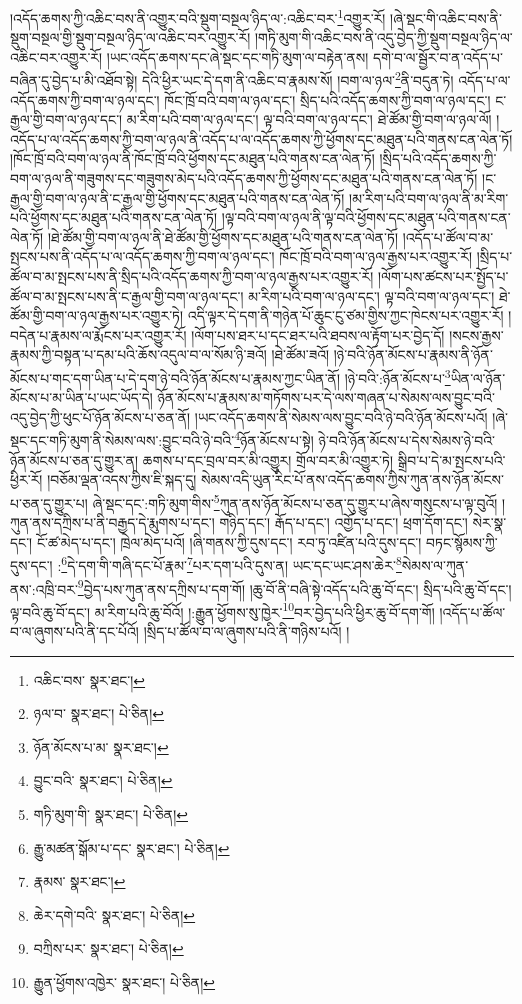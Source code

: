 །འདོད་ཆགས་ཀྱི་འཆིང་བས་ནི་འགྱུར་བའི་སྡུག་བསྔལ་ཉིད་ལ་:འཆིང་བར་\footnote{འཆིང་བས་  སྣར་ཐང་། }འགྱུར་རོ། །ཞེ་སྡང་གི་འཆིང་བས་ནི་སྡུག་བསྔལ་གྱི་སྡུག་བསྔལ་ཉིད་ལ་འཆིང་བར་འགྱུར་རོ། །གཏི་མུག་གི་འཆིང་བས་ནི་འདུ་བྱེད་ཀྱི་སྡུག་བསྔལ་ཉིད་ལ་འཆིང་བར་འགྱུར་རོ། །ཡང་འདོད་ཆགས་དང་ཞེ་སྡང་དང་གཏི་མུག་ལ་བརྟེན་ནས། དགེ་བ་ལ་སྦྱོར་བ་ན་འདོད་པ་བཞིན་དུ་བྱེད་པ་མི་འཐོབ་སྟེ། དེའི་ཕྱིར་ཡང་དེ་དག་ནི་འཆིང་བ་རྣམས་སོ། །བག་ལ་ཉལ་\footnote{ཉལ་བ་  སྣར་ཐང་།  པེ་ཅིན། }ནི་བདུན་ཏེ། འདོད་པ་ལ་འདོད་ཆགས་ཀྱི་བག་ལ་ཉལ་དང་། ཁོང་ཁྲོ་བའི་བག་ལ་ཉལ་དང་། སྲིད་པའི་འདོད་ཆགས་ཀྱི་བག་ལ་ཉལ་དང་། ང་རྒྱལ་གྱི་བག་ལ་ཉལ་དང་། མ་རིག་པའི་བག་ལ་ཉལ་དང་། ལྟ་བའི་བག་ལ་ཉལ་དང་། ཐེ་ཚོམ་གྱི་བག་ལ་ཉལ་ལོ། །འདོད་པ་ལ་འདོད་ཆགས་ཀྱི་བག་ལ་ཉལ་ནི་འདོད་པ་ལ་འདོད་ཆགས་ཀྱི་ཕྱོགས་དང་མཐུན་པའི་གནས་ངན་ལེན་ཏོ། །ཁོང་ཁྲོ་བའི་བག་ལ་ཉལ་ནི་ཁོང་ཁྲོ་བའི་ཕྱོགས་དང་མཐུན་པའི་གནས་ངན་ལེན་ཏོ། །སྲིད་པའི་འདོད་ཆགས་ཀྱི་བག་ལ་ཉལ་ནི་གཟུགས་དང་གཟུགས་མེད་པའི་འདོད་ཆགས་ཀྱི་ཕྱོགས་དང་མཐུན་པའི་གནས་ངན་ལེན་ཏོ། །ང་རྒྱལ་གྱི་བག་ལ་ཉལ་ནི་ང་རྒྱལ་གྱི་ཕྱོགས་དང་མཐུན་པའི་གནས་ངན་ལེན་ཏོ། །མ་རིག་པའི་བག་ལ་ཉལ་ནི་མ་རིག་པའི་ཕྱོགས་དང་མཐུན་པའི་གནས་ངན་ལེན་ཏོ། །ལྟ་བའི་བག་ལ་ཉལ་ནི་ལྟ་བའི་ཕྱོགས་དང་མཐུན་པའི་གནས་ངན་ལེན་ཏོ། །ཐེ་ཚོམ་གྱི་བག་ལ་ཉལ་ནི་ཐེ་ཚོམ་གྱི་ཕྱོགས་དང་མཐུན་པའི་གནས་ངན་ལེན་ཏོ། །འདོད་པ་ཚོལ་བ་མ་སྤངས་པས་ནི་འདོད་པ་ལ་འདོད་ཆགས་ཀྱི་བག་ལ་ཉལ་དང་། ཁོང་ཁྲོ་བའི་བག་ལ་ཉལ་རྒྱས་པར་འགྱུར་རོ། །སྲིད་པ་ཚོལ་བ་མ་སྤངས་པས་ནི་སྲིད་པའི་འདོད་ཆགས་ཀྱི་བག་ལ་ཉལ་རྒྱས་པར་འགྱུར་རོ། །ལོག་པས་ཚངས་པར་སྤྱོད་པ་ཚོལ་བ་མ་སྤངས་པས་ནི་ང་རྒྱལ་གྱི་བག་ལ་ཉལ་དང་། མ་རིག་པའི་བག་ལ་ཉལ་དང་། ལྟ་བའི་བག་ལ་ཉལ་དང་། ཐེ་ཚོམ་གྱི་བག་ལ་ཉལ་རྒྱས་པར་འགྱུར་ཏེ། འདི་ལྟར་དེ་དག་ནི་གཉེན་པོ་ཆུང་ངུ་ཙམ་གྱིས་ཀྱང་ཁེངས་པར་འགྱུར་རོ། །བདེན་པ་རྣམས་ལ་རྨོངས་པར་འགྱུར་རོ། །ལོག་པས་ཐར་པ་དང་ཐར་པའི་ཐབས་ལ་རྟོག་པར་བྱེད་དོ། །སངས་རྒྱས་རྣམས་ཀྱི་བསྟན་པ་དམ་པའི་ཆོས་འདུལ་བ་ལ་སོམ་ཉི་ཟའོ། །ཐེ་ཚོམ་ཟའོ། །ཉེ་བའི་ཉོན་མོངས་པ་རྣམས་ནི་ཉོན་མོངས་པ་གང་དག་ཡིན་པ་དེ་དག་ཉེ་བའི་ཉོན་མོངས་པ་རྣམས་ཀྱང་ཡིན་ནོ། །ཉེ་བའི་:ཉོན་མོངས་པ་\footnote{ཉོན་མོངས་པ་མ་  སྣར་ཐང་། }ཡིན་ལ་ཉོན་མོངས་པ་མ་ཡིན་པ་ཡང་ཡོད་དེ། ཉོན་མོངས་པ་རྣམས་མ་གཏོགས་པར་དེ་ལས་གཞན་པ་སེམས་ལས་བྱུང་བའི་འདུ་བྱེད་ཀྱི་ཕུང་པོ་ཉོན་མོངས་པ་ཅན་ནོ། །ཡང་འདོད་ཆགས་ནི་སེམས་ལས་བྱུང་བའི་ཉེ་བའི་ཉོན་མོངས་པའོ། །ཞེ་སྡང་དང་གཏི་མུག་ནི་སེམས་ལས་:བྱུང་བའི་ཉེ་བའི་\footnote{བྱུང་བའི་  སྣར་ཐང་།  པེ་ཅིན། }ཉོན་མོངས་པ་སྟེ། ཉེ་བའི་ཉོན་མོངས་པ་དེས་སེམས་ཉེ་བའི་ཉོན་མོངས་པ་ཅན་དུ་གྱུར་ན། ཆགས་པ་དང་བྲལ་བར་མི་འགྱུར། གྲོལ་བར་མི་འགྱུར་ཏེ། སྒྲིབ་པ་དེ་མ་སྤངས་པའི་ཕྱིར་རོ། །བཅོམ་ལྡན་འདས་ཀྱིས་ཇི་སྐད་དུ། སེམས་འདི་ཡུན་རིང་པོ་ནས་འདོད་ཆགས་ཀྱིས་ཀུན་ནས་ཉོན་མོངས་པ་ཅན་དུ་གྱུར་པ། ཞེ་སྡང་དང་:གཏི་མུག་གིས་\footnote{གཏི་མུག་གི་  སྣར་ཐང་།  པེ་ཅིན། }ཀུན་ནས་ཉོན་མོངས་པ་ཅན་དུ་གྱུར་པ་ཞེས་གསུངས་པ་ལྟ་བུའོ། །ཀུན་ནས་དཀྲིས་པ་ནི་བརྒྱད་དེ་རྨུགས་པ་དང་། གཉིད་དང་། རྒོད་པ་དང་། འགྱོད་པ་དང་། ཕྲག་དོག་དང་། སེར་སྣ་དང་། ངོ་ཚ་མེད་པ་དང་། ཁྲེལ་མེད་པའོ། །ཞི་གནས་ཀྱི་དུས་དང་། རབ་ཏུ་འཛིན་པའི་དུས་དང་། བཏང་སྙོམས་ཀྱི་དུས་དང་། :\footnote{རྒྱུ་མཚན་སྒོམ་པ་དང་  སྣར་ཐང་།  པེ་ཅིན། }དེ་དག་གི་གཞི་དང་པོ་རྣམ་\footnote{རྣམས་  སྣར་ཐང་། }པར་དག་པའི་དུས་ན། ཡང་དང་ཡང་ཤས་ཆེར་\footnote{ཆེར་དགེ་བའི་  སྣར་ཐང་།  པེ་ཅིན། }སེམས་ལ་ཀུན་ནས་:འཁྲི་བར་\footnote{བཀྲིས་པར་  སྣར་ཐང་།  པེ་ཅིན། }བྱེད་པས་ཀུན་ནས་དཀྲིས་པ་དག་གོ། །ཆུ་བོ་ནི་བཞི་སྟེ་འདོད་པའི་ཆུ་བོ་དང་། སྲིད་པའི་ཆུ་བོ་དང་། ལྟ་བའི་ཆུ་བོ་དང་། མ་རིག་པའི་ཆུ་བོའོ། །:རྒྱུན་ཕྱོགས་སུ་ཁྱེར་\footnote{རྒྱུན་ཕྱོགས་འཁྱེར་  སྣར་ཐང་།  པེ་ཅིན། }བར་བྱེད་པའི་ཕྱིར་ཆུ་བོ་དག་གོ། །འདོད་པ་ཚོལ་བ་ལ་ཞུགས་པའི་ནི་དང་པོའོ། །སྲིད་པ་ཚོལ་བ་ལ་ཞུགས་པའི་ནི་གཉིས་པའོ། །
